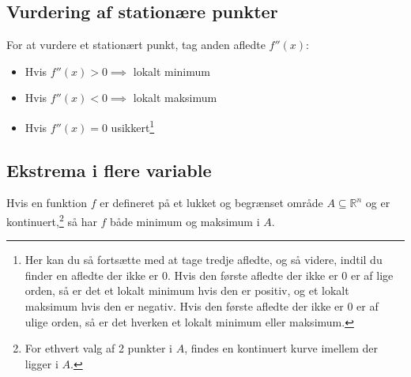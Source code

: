 
\subsection{Vurdering af stationære punkter}
For at vurdere et stationært punkt, tag anden afledte $f''(x)$:
\begin{itemize}
    \item Hvis $f''(x) > 0 \implies$ lokalt minimum
    \item Hvis $f''(x) < 0 \implies$ lokalt maksimum
    \item Hvis $f''(x) = 0$ usikkert\footnote{Her kan du så fortsætte med at tage tredje afledte, og så videre, indtil du finder en afledte der ikke er 0. Hvis den første afledte der ikke er 0 er af lige orden, så er det et lokalt minimum hvis den er positiv, og et lokalt maksimum hvis den er negativ. Hvis den første afledte der ikke er 0 er af ulige orden, så er det hverken et lokalt minimum eller maksimum.}
\end{itemize}


\subsection{Ekstrema i flere variable}
Hvis en funktion $f$ er defineret på et lukket og begrænset område $A \subseteq \mathbb R^n$ og er kontinuert,\footnote{For ethvert valg af 2 punkter i $A$, findes en kontinuert kurve imellem der ligger i $A$.}
så har $f$ både minimum og maksimum i $A$.

